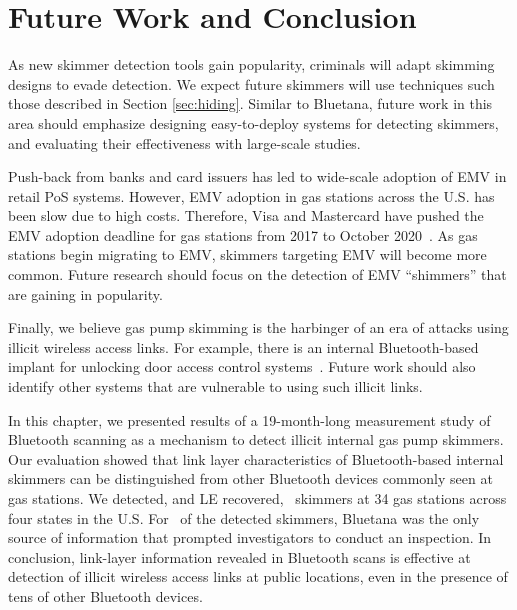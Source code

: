 \section{Future Work and Conclusion}
\label{sec:conclusion}

As new skimmer detection tools gain popularity, criminals will adapt skimming designs to evade detection.
%
We expect future skimmers will use techniques such those described in Section \ref{sec:hiding}.
%
Similar to Bluetana, future work in this area should emphasize designing easy-to-deploy systems for detecting
skimmers, and evaluating their effectiveness with large-scale studies.

Push-back from banks and card issuers has led to wide-scale adoption of EMV in
retail PoS systems. 
%
However, EMV adoption in gas stations across the U.S. has been slow due to high
costs.
%
Therefore, Visa and Mastercard have pushed the EMV adoption deadline for gas
stations from 2017 to October 2020~\cite{emv2020}. 
%
As gas stations begin migrating to EMV, skimmers targeting EMV will become more
common. 
%
Future research should focus on the detection of EMV ``shimmers'' that are
gaining in popularity.

Finally, we believe gas pump skimming is the harbinger of an era of attacks
using illicit wireless access links. 
%
For example, there is an internal Bluetooth-based implant for unlocking door
access control systems~\cite{blekey}. 
%
Future work should also identify other
systems that are vulnerable to using such illicit links.

In this chapter, we presented results of a 19-month-long measurement study of
Bluetooth scanning as a mechanism to detect illicit internal gas pump skimmers. 
%
Our evaluation showed that link layer characteristics of Bluetooth-based internal skimmers
can be distinguished from other Bluetooth devices commonly seen at gas
stations. 
%
We detected, and LE recovered, \totalskimmers~skimmers at 34 gas
stations across four states in the U.S. 
%
For \totalskimmersBluetana~of the detected skimmers, Bluetana was the only
source of information that prompted investigators to conduct an inspection.
%
In conclusion, link-layer information revealed in Bluetooth scans is effective at detection of illicit wireless access links at public locations, even in the presence of tens of other Bluetooth devices.

\begin{comment}
This paper presented Bluetana, a empirical measurement study of Bluetooth's ability to detect internal
card skimmers. Bluetooth makes it possible to quickly and accurately detect skimmers within gas dispensers.
Our evaluation has shown that Bluetooth is a promising method of skimmer detection, capable of
detecting ~\totalskimmers~ skimmers for a \emph{daily} monetary impact of ~\Bluetanafraudprevented~ dollars in a study of ~\visitedgasstations~ stations.
\end{comment}

